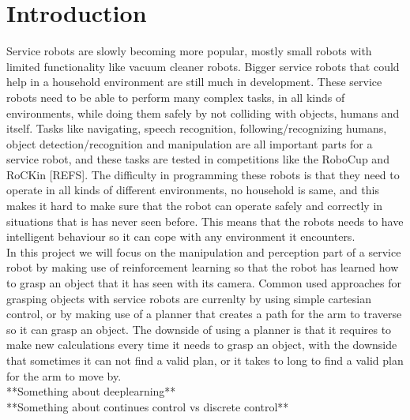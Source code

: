 \section{Introduction}
Service robots are slowly becoming more popular, mostly small robots with limited functionality like vacuum cleaner robots. Bigger service robots that could help in a household environment are still much in development. 
These service robots need to be able to perform many complex tasks, in all kinds of environments, while doing them safely by not colliding with objects, humans and itself.   
Tasks like navigating, speech recognition, following/recognizing humans, object detection/recognition and manipulation are all important parts for a service robot, 
and these tasks are tested in competitions like the RoboCup and RoCKin [REFS]. The difficulty in programming these robots is that they need to operate in all kinds of different environments, no household is same, and this makes it hard
to make sure that the robot can operate safely and correctly in situations that is has never seen before. This means that the robots needs to have intelligent behaviour so it can cope with any environment it encounters. \\
In this project we will focus on the manipulation and perception part of a service robot by making use of reinforcement learning so that the robot has learned how to grasp an object that it has seen with its camera.  
Common used approaches for grasping objects with service robots are currenlty by using simple cartesian control, or by making use of a planner that creates a path for the arm to traverse so it can grasp an object. 
The downside of using a planner is that it requires to make new calculations every time it needs to grasp an object, with the downside that sometimes it can not find a valid plan, or it takes to long to find a valid plan
for the arm to move by. \\
**Something about deeplearning** \\
**Something about continues control vs discrete control** \\



%
 



